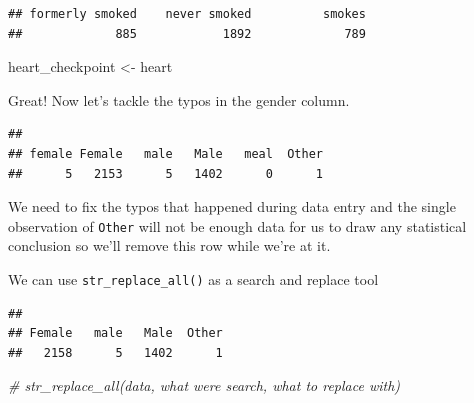 \documentclass[
]{book}
\newenvironment{Shaded}{\begin{snugshade}}{\end{snugshade}}
\newcommand{\CommentTok}[1]{\textcolor[rgb]{0.56,0.35,0.01}{\textit{#1}}}
\newcommand{\FunctionTok}[1]{\textcolor[rgb]{0.13,0.29,0.53}{\textbf{#1}}}
\newcommand{\NormalTok}[1]{#1}
\newcommand{\OtherTok}[1]{\textcolor[rgb]{0.56,0.35,0.01}{#1}}
\newcommand{\SpecialCharTok}[1]{\textcolor[rgb]{0.81,0.36,0.00}{\textbf{#1}}}
\newcommand{\StringTok}[1]{\textcolor[rgb]{0.31,0.60,0.02}{#1}}
\begin{document}
\begin{verbatim}
## formerly smoked    never smoked          smokes 
##             885            1892             789
\end{verbatim}

\begin{Shaded}
\begin{Highlighting}[]
\NormalTok{heart\_checkpoint }\OtherTok{\textless{}{-}}\NormalTok{ heart}
\end{Highlighting}
\end{Shaded}

Great! Now let's tackle the typos in the gender column.

\begin{Shaded}
\end{Shaded}

\begin{verbatim}
## 
## female Female   male   Male   meal  Other 
##      5   2153      5   1402      0      1
\end{verbatim}

We need to fix the typos that happened during data entry and the single observation of \texttt{Other} will not be enough data for us to draw any statistical conclusion so we'll remove this row while we're at it.

We can use \texttt{str\_replace\_all()} as a search and replace tool

\begin{Shaded}
\end{Shaded}

\begin{verbatim}
## 
## Female   male   Male  Other 
##   2158      5   1402      1
\end{verbatim}

\begin{Shaded}
\begin{Highlighting}[]
\CommentTok{\# str\_replace\_all(data, what we\textquotesingle{}re search, what to replace with)}
\end{Highlighting}
\end{Shaded}
\end{document}
